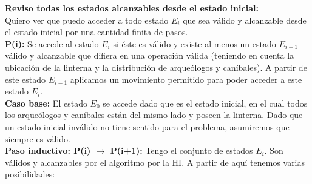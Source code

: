 \textbf{Reviso todas los estados alcanzables desde el estado inicial:}
\\
Quiero ver que puedo acceder a todo estado $E_i$ que sea válido y alcanzable desde el estado inicial por una cantidad finita de pasos.
\\

\textbf{P(i): } Se accede al estado $E_i$ si éste es válido y existe al menos un estado $E_{i-1}$ válido y alcanzable que difiera en una operación válida (teniendo en cuenta la ubicación de la linterna y la distribución de arqueólogos y caníbales). A partir de este estado $E_{i-1}$ aplicamos un movimiento permitido para poder acceder a este estado $E_i$.
\\

\textbf{Caso base: } El estado $E_0$ se accede dado que es el estado inicial, en el cual todos los arqueólogos y caníbales están del mismo lado y poseen la linterna. Dado que un estado inicial inválido no tiene sentido para el problema, asumiremos que siempre es válido.
\\


\textbf{Paso inductivo: P(i) $\rightarrow$ P(i+1): }  Tengo el conjunto de estados $E_i$. Son válidos y alcanzables por el algoritmo por la HI. A partir de aquí tenemos varias posibilidades:

